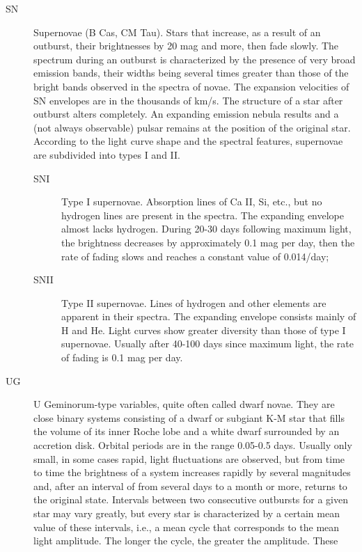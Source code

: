 \begin{description}
\begin{description}
	\end{description}
\item[SN]		Supernovae (B Cas, CM Tau). Stars that increase, as a
				result of an outburst, their brightnesses by 20 mag and more, then fade
				slowly. The spectrum during an outburst is characterized by the presence
				of very broad emission bands, their widths being several times greater
				than those of the bright bands observed in the spectra of novae. The
				expansion velocities of SN envelopes are in the thousands of km/s. The
				structure of a star after outburst alters completely. An expanding
				emission nebula results and a (not always observable) pulsar remains at
				the position of the original star. According to the light curve shape
				and the spectral features, supernovae are subdivided into types I and II.
	\begin{description}
\item[SNI]		Type I supernovae. Absorption lines of Ca II, Si, etc., but
				no hydrogen lines are present in the spectra. The expanding envelope
				almost lacks hydrogen. During 20-30 days following maximum light, the
				brightness decreases by approximately 0.1 mag per day, then the rate of
				fading slows and reaches a constant value of 0.014/day;
\item[SNII]		Type II supernovae. Lines of hydrogen and other elements
				are apparent in their spectra. The expanding envelope consists mainly of
				H and He. Light curves show greater diversity than those of type I
				supernovae. Usually after 40-100 days since maximum light, the rate of
				fading is 0.1 mag per day.
	\end{description}
\item[UG]		U Geminorum-type variables, quite often called dwarf
				novae. They are close binary systems consisting of a dwarf or subgiant
				K-M star that fills the volume of its inner Roche lobe and a white dwarf
				surrounded by an accretion disk. Orbital periods are in the range
				0.05-0.5 days. Usually only small, in some cases rapid, light
				fluctuations are observed, but from time to time the brightness of a
				system increases rapidly by several magnitudes and, after an interval of
				from several days to a month or more, returns to the original state.
				Intervals between two consecutive outbursts for a given star may vary
				greatly, but every star is characterized by a certain mean value of
				these intervals, i.e., a mean cycle that corresponds to the mean light
				amplitude. The longer the cycle, the greater the amplitude. These

\end{description}
